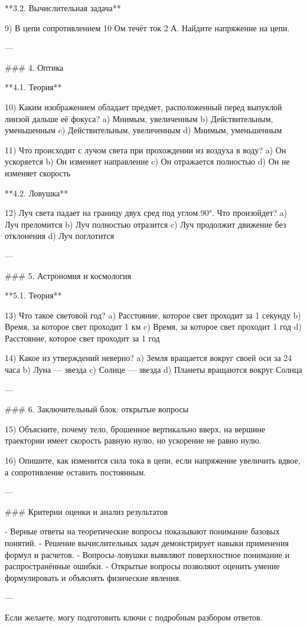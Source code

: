 \documentclass{article}
\begin{document}
**3.2. Вычислительная задача**

9) В цепи сопротивлением 10 Ом течёт ток 2 А. Найдите напряжение на цепи.

---

### 4. Оптика

**4.1. Теория**

10) Каким изображением обладает предмет, расположенный перед выпуклой линзой дальше её фокуса?  
a) Мнимым, увеличенным  
b) Действительным, уменьшенным  
c) Действительным, увеличенным  
d) Мнимым, уменьшенным

11) Что происходит с лучом света при прохождении из воздуха в воду?  
a) Он ускоряется  
b) Он изменяет направление  
c) Он отражается полностью  
d) Он не изменяет скорость

**4.2. Ловушка**

12) Луч света падает на границу двух сред под углом 90°. Что произойдет?  
a) Луч преломится  
b) Луч полностью отразится  
c) Луч продолжит движение без отклонения  
d) Луч поглотится

---

### 5. Астрономия и космология

**5.1. Теория**

13) Что такое световой год?  
a) Расстояние, которое свет проходит за 1 секунду  
b) Время, за которое свет проходит 1 км  
c) Время, за которое свет проходит 1 год  
d) Расстояние, которое свет проходит за 1 год

14) Какое из утверждений неверно?  
a) Земля вращается вокруг своей оси за 24 часа  
b) Луна — звезда  
c) Солнце — звезда  
d) Планеты вращаются вокруг Солнца

---

### 6. Заключительный блок: открытые вопросы

15) Объясните, почему тело, брошенное вертикально вверх, на вершине траектории имеет скорость равную нулю, но ускорение не равно нулю.

16) Опишите, как изменится сила тока в цепи, если напряжение увеличить вдвое, а сопротивление оставить постоянным.

---

### Критерии оценки и анализ результатов

- Верные ответы на теоретические вопросы показывают понимание базовых понятий.  
- Решение вычислительных задач демонстрирует навыки применения формул и расчетов.  
- Вопросы-ловушки выявляют поверхностное понимание и распространённые ошибки.  
- Открытые вопросы позволяют оценить умение формулировать и объяснять физические явления.

---

Если желаете, могу подготовить ключи с подробным разбором ответов.
\end{document}
